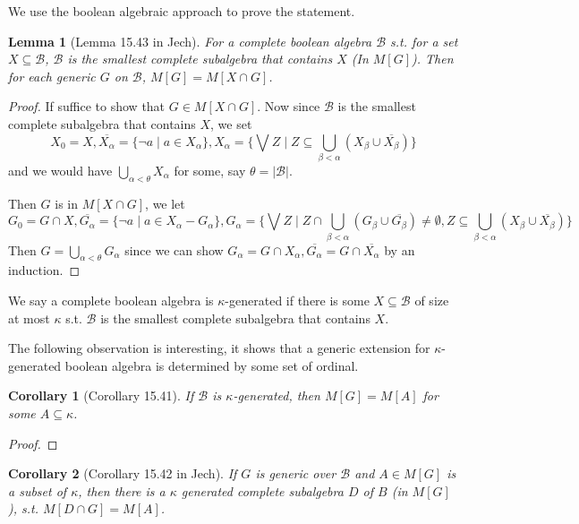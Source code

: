 \documentclass{article}
\newtheorem{lemma}{Lemma}
\newtheorem{corollary}{Corollary}
\begin{document}
We use the boolean algebraic approach to prove the statement.


\begin{lemma}[Lemma 15.43 in Jech]\label{lem:boolean-generate}
    For a complete boolean algebra $\mathcal{B}$ s.t. for a set $X\subseteq \mathcal{B}$, $\mathcal{B}$ is the smallest complete subalgebra that contains $X$ (In $M[G]$). Then for each generic $G$ on $\mathcal{B}$, $M[G] = M[X\cap G]$.
\end{lemma}

\begin{proof}
    If suffice to show that $G\in M[X\cap G]$. Now since $\mathcal{B}$ is the smallest complete subalgebra that contains $X$, we set $$X_0 = X,  \overline{X_\alpha} = \{\neg a\mid a\in X_\alpha\}, X_\alpha = \{\bigvee Z\mid Z\subseteq \bigcup_{\beta<\alpha}(X_\beta\cup \overline{X_\beta})\}$$
    and we would have $\bigcup_{\alpha<\theta}X_\alpha$ for some, say $\theta = |\mathcal{B}|$. 

    Then $G$ is in $M[X\cap G]$, we let $$G_0 = G\cap X, \overline{G_\alpha} = \{\neg a\mid a\in X_\alpha - G_\alpha\}, G_\alpha = \{\bigvee Z\mid Z\cap \bigcup_{\beta<\alpha}(G_\beta\cup \overline{G_\beta})\neq \emptyset, Z\subseteq \bigcup_{\beta<\alpha}(X_\beta\cup \overline{X_\beta})\}$$
    Then $G = \bigcup_{\alpha<\theta}G_\alpha$  since we can show $G_\alpha = G\cap X_\alpha, \overline{G_\alpha} = G\cap \overline{X_\alpha}$ by an induction.
\end{proof}

We say a complete boolean algebra is $\kappa$-generated if there is some $X\subseteq \mathcal{B}$ of size at most $\kappa$ s.t. $\mathcal{B}$ is the smallest complete subalgebra that contains $X$.

The following observation is interesting, it shows that a generic extension for $\kappa$-generated boolean algebra is determined by some set of ordinal.

\begin{corollary}[Corollary 15.41]
    If $\mathcal{B}$ is $\kappa$-generated, then $M[G] = M[A]$ for some $A\subseteq \kappa$.
\end{corollary}

\begin{proof}
    
\end{proof}

\begin{corollary}[Corollary 15.42 in Jech]
    If $G$ is generic over $\mathcal{B}$ and $A\in M[G]$ is a subset of $\kappa$, then there is a $\kappa$ generated complete subalgebra $D$ of $B$ (in $M[G]$), s.t. $M[D\cap G] = M[A]$.
\end{corollary}
\end{document}
